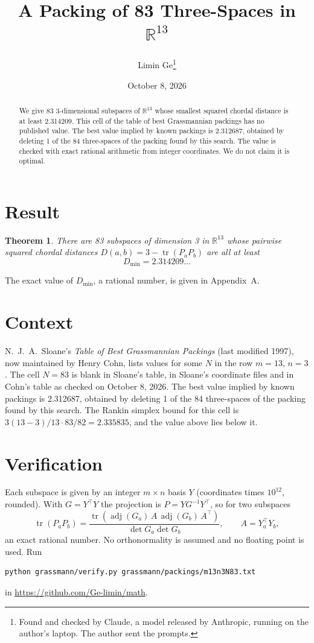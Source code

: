 \documentclass[11pt,a4paper]{article}
\title{A Packing of 83 Three-Spaces in $\mathbb{R}^{13}$}
\author{Limin Ge\thanks{Found and checked by Claude, a model released by Anthropic, running on the author's laptop. The author sent the prompts.}}
\date{October 8, 2026}
\newtheorem*{theorem}{Theorem}
\begin{document}
\maketitle
\begin{abstract}
We give 83 3-dimensional subspaces of $\mathbb{R}^{13}$ whose smallest squared chordal distance is at least 2.314209. This cell of the table of best Grassmannian packings has no published value. The best value implied by known packings is 2.312687, obtained by deleting 1 of the 84 three-spaces of the packing found by this search. The value is checked with exact rational arithmetic from integer coordinates. We do not claim it is optimal.
\end{abstract}

\section{Result}
\begin{theorem}
There are 83 subspaces of dimension 3 in $\mathbb{R}^{13}$ whose pairwise squared chordal distances $D(a,b) = 3 - \operatorname{tr}(P_aP_b)$ are all at least
\[ D_{\min} = 2.314209\ldots \]
\end{theorem}
The exact value of $D_{\min}$, a rational number, is given in Appendix~A.


\section{Context}
N.~J.~A.~Sloane's \emph{Table of Best Grassmannian Packings} (last modified 1997), now maintained by Henry Cohn, lists values for some $N$ in the row $m=13$, $n=3$. The cell $N=83$ is blank in Sloane's table, in Sloane's coordinate files and in Cohn's table as checked on October 8, 2026. The best value implied by known packings is 2.312687, obtained by deleting 1 of the 84 three-spaces of the packing found by this search. The Rankin simplex bound for this cell is $3(13-3)/13\cdot 83/82 = 2.335835$, and the value above lies below it.


\section{Verification}
Each subspace is given by an integer $m\times n$ basis $Y$ (coordinates times $10^{12}$, rounded). With $G=Y^\top Y$ the projection is $P=YG^{-1}Y^\top$, so for two subspaces
\[ \operatorname{tr}(P_aP_b)=\frac{\operatorname{tr}(\operatorname{adj}(G_a)\,A\,\operatorname{adj}(G_b)\,A^\top)}{\det G_a\det G_b},\qquad A=Y_a^\top Y_b, \]
an exact rational number. No orthonormality is assumed and no floating point is used. Run
\begin{verbatim}
python grassmann/verify.py grassmann/packings/m13n3N83.txt
\end{verbatim}
in \url{https://github.com/Ge-limin/math}.
\end{document}
